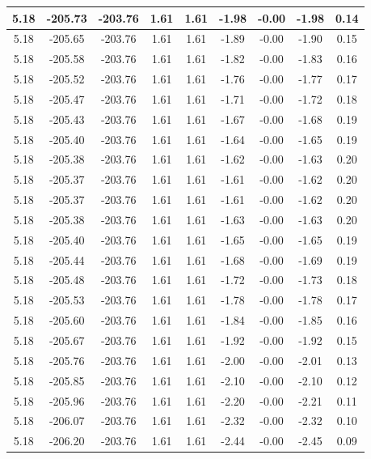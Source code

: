 \begin{table}[htbp]
\begin{adjustbox}{angle=90}
\begin{tabular}{|c|c|c|c|c|c|c|c|c|}
 5.18 & -205.73 & -203.76 & 1.61 & 1.61 & -1.98 & -0.00 & -1.98 & 0.14\\ \hline
 5.18 & -205.65 & -203.76 & 1.61 & 1.61 & -1.89 & -0.00 & -1.90 & 0.15\\ \hline
 5.18 & -205.58 & -203.76 & 1.61 & 1.61 & -1.82 & -0.00 & -1.83 & 0.16\\ \hline
 5.18 & -205.52 & -203.76 & 1.61 & 1.61 & -1.76 & -0.00 & -1.77 & 0.17\\ \hline
 5.18 & -205.47 & -203.76 & 1.61 & 1.61 & -1.71 & -0.00 & -1.72 & 0.18\\ \hline
 5.18 & -205.43 & -203.76 & 1.61 & 1.61 & -1.67 & -0.00 & -1.68 & 0.19\\ \hline
 5.18 & -205.40 & -203.76 & 1.61 & 1.61 & -1.64 & -0.00 & -1.65 & 0.19\\ \hline
 5.18 & -205.38 & -203.76 & 1.61 & 1.61 & -1.62 & -0.00 & -1.63 & 0.20\\ \hline
 5.18 & -205.37 & -203.76 & 1.61 & 1.61 & -1.61 & -0.00 & -1.62 & 0.20\\ \hline
 5.18 & -205.37 & -203.76 & 1.61 & 1.61 & -1.61 & -0.00 & -1.62 & 0.20\\ \hline
 5.18 & -205.38 & -203.76 & 1.61 & 1.61 & -1.63 & -0.00 & -1.63 & 0.20\\ \hline
 5.18 & -205.40 & -203.76 & 1.61 & 1.61 & -1.65 & -0.00 & -1.65 & 0.19\\ \hline
 5.18 & -205.44 & -203.76 & 1.61 & 1.61 & -1.68 & -0.00 & -1.69 & 0.19\\ \hline
 5.18 & -205.48 & -203.76 & 1.61 & 1.61 & -1.72 & -0.00 & -1.73 & 0.18\\ \hline
 5.18 & -205.53 & -203.76 & 1.61 & 1.61 & -1.78 & -0.00 & -1.78 & 0.17\\ \hline
 5.18 & -205.60 & -203.76 & 1.61 & 1.61 & -1.84 & -0.00 & -1.85 & 0.16\\ \hline
 5.18 & -205.67 & -203.76 & 1.61 & 1.61 & -1.92 & -0.00 & -1.92 & 0.15\\ \hline
 5.18 & -205.76 & -203.76 & 1.61 & 1.61 & -2.00 & -0.00 & -2.01 & 0.13\\ \hline
 5.18 & -205.85 & -203.76 & 1.61 & 1.61 & -2.10 & -0.00 & -2.10 & 0.12\\ \hline
 5.18 & -205.96 & -203.76 & 1.61 & 1.61 & -2.20 & -0.00 & -2.21 & 0.11\\ \hline
 5.18 & -206.07 & -203.76 & 1.61 & 1.61 & -2.32 & -0.00 & -2.32 & 0.10\\ \hline
 5.18 & -206.20 & -203.76 & 1.61 & 1.61 & -2.44 & -0.00 & -2.45 & 0.09\\ \hline

\end{tabular}
\end{adjustbox}
\end{table}
